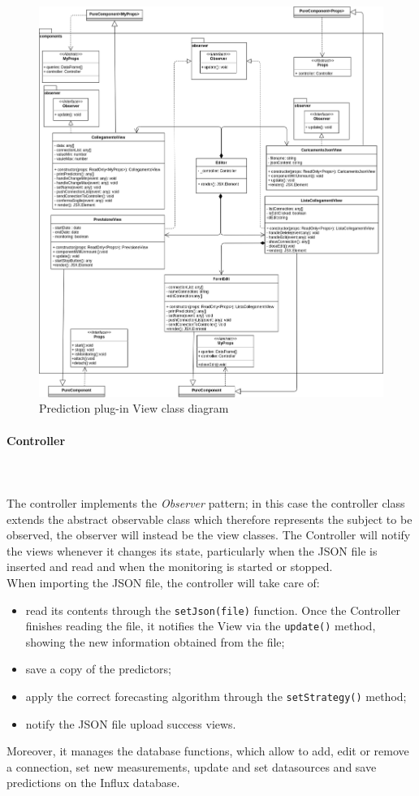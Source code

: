 \begin{figure}[H]
\centering
\includegraphics[scale=0.40]{../../../Diagrams/Classes_diagrams/plugin_view.png}
\caption{Prediction plug-in View class diagram}
\end{figure}

\paragraph{Controller}\mbox{} \\ \mbox{} \\
The controller implements the \textit{Observer} pattern; in this case the controller class extends the abstract observable class which therefore represents the subject to be observed, the observer will instead be the view classes.
The Controller will notify the views whenever it changes its state, particularly when the JSON file is inserted and read and when the monitoring is started or stopped.\\
When importing the JSON file, the controller will take care of: \begin{itemize}
\item read its contents through the \texttt{setJson(file)} function. Once the Controller finishes reading the file, it notifies the View via the \texttt{update()} method, showing the new information obtained from the file;
\item save a copy of the predictors;
\item apply the correct forecasting algorithm through the \texttt{setStrategy()} method;
\item notify the JSON file upload success views.
\end{itemize}
Moreover, it manages the database functions, which allow to add, edit or remove a connection, set new measurements, update and set datasources and save predictions on the Influx database.\\

